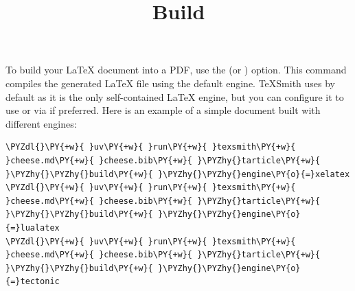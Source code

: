 \documentclass[a4paper,twoside]{article}
\title{Build}
\author{}\date{}
\begin{document}
\maketitle
To build your \LaTeX{} document into a PDF, use the  (or ) option. This command compiles the generated \LaTeX{} file using the default engine. TeXSmith uses  by default as it is the only self-contained \LaTeX{} engine, but you can configure it to use  or  via  if preferred. Here is an example of a simple document built with different engines:
\begin{tscode}[lang=bash, engine=pygments]
\begin{Verbatim}[commandchars=\\\{\},breaklines, breakanywhere, commandchars=\\\{\}]
\PYZdl{}\PY{+w}{ }uv\PY{+w}{ }run\PY{+w}{ }texsmith\PY{+w}{ }cheese.md\PY{+w}{ }cheese.bib\PY{+w}{ }\PYZhy{}tarticle\PY{+w}{ }\PYZhy{}\PYZhy{}build\PY{+w}{ }\PYZhy{}\PYZhy{}engine\PY{o}{=}xelatex
\PYZdl{}\PY{+w}{ }uv\PY{+w}{ }run\PY{+w}{ }texsmith\PY{+w}{ }cheese.md\PY{+w}{ }cheese.bib\PY{+w}{ }\PYZhy{}tarticle\PY{+w}{ }\PYZhy{}\PYZhy{}build\PY{+w}{ }\PYZhy{}\PYZhy{}engine\PY{o}{=}lualatex
\PYZdl{}\PY{+w}{ }uv\PY{+w}{ }run\PY{+w}{ }texsmith\PY{+w}{ }cheese.md\PY{+w}{ }cheese.bib\PY{+w}{ }\PYZhy{}tarticle\PY{+w}{ }\PYZhy{}\PYZhy{}build\PY{+w}{ }\PYZhy{}\PYZhy{}engine\PY{o}{=}tectonic
\end{Verbatim}
\end{tscode}
\end{document}
